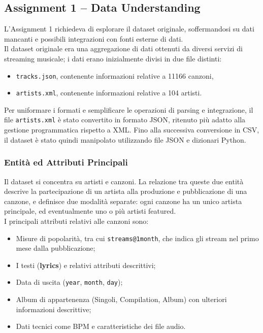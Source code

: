 \subsection*{Assignment 1 -- Data Understanding}
L'Assignment 1 richiedeva di esplorare il dataset originale,
soffermandosi su dati mancanti e possibili integrazioni con fonti
esterne di dati.\\

Il dataset originale era una aggregazione di dati ottenuti da diversi
servizi di streaming musicale; i dati erano inizialmente divisi in due
file distinti:
\begin{itemize}
    \item \texttt{tracks.json}, contenente informazioni relative a 11166
    canzoni,
    \item \texttt{artists.xml}, contenente informazioni relative a 104
    artisti.
\end{itemize}

Per uniformare i formati e semplificare le operazioni di parsing e
integrazione, il file \texttt{artists.xml} è stato convertito in formato
JSON, ritenuto più adatto alla gestione programmatica rispetto a XML.
Fino alla successiva conversione in CSV, il dataset è stato quindi
manipolato utilizzando file JSON e dizionari Python.\\

\subsubsection*{Entità ed Attributi Principali}
Il dataset si concentra su artisti e canzoni.
La relazione tra queste due entità descrive la partecipazione di
un artista alla produzione e pubblicazione di una canzone, e definisce
due modalità separate:
ogni canzone ha un unico artista principale, ed eventualmente uno o più
artisti featured.\\

I principali attributi relativi alle canzoni sono:
\begin{itemize}
    \item Misure di popolarità, tra cui \texttt{streams@1month}, che
    indica gli stream nel primo mese dalla pubblicazione;  
    \item I testi (\textbf{lyrics}) e relativi attributi descrittivi;  
    \item Data di uscita (\texttt{year}, \texttt{month}, \texttt{day});  
    \item Album di appartenenza (Singoli, Compilation, Album) con
    ulteriori informazioni descrittive;
    \item Dati tecnici come BPM e caratteristiche dei file audio.
\end{itemize}

